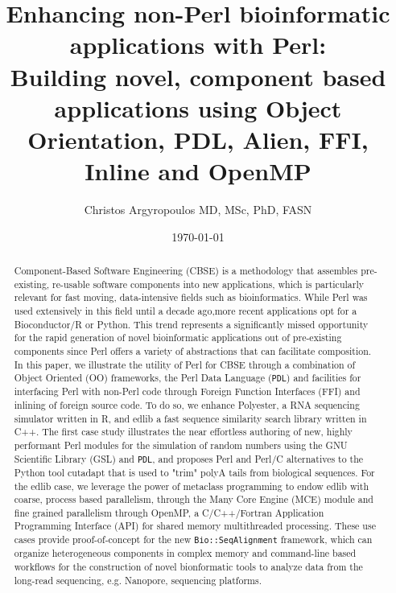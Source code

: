 \documentclass[10pt]{article}
\title{Enhancing non-Perl bioinformatic applications with Perl:\\[1ex] \large Building novel, component based applications using Object Orientation, PDL, Alien, FFI, Inline and OpenMP}
\author{Christos Argyropoulos MD, MSc, PhD, FASN}
\affil{Department of Internal Medicine, School of Medicine, University of New Mexico, Albuquerque, New Mexico, USA}
\date{\today}
\begin{document}
\maketitle

\begin{abstract}
Component-Based Software Engineering (CBSE) is a methodology that assembles pre-existing, re-usable software components into new applications, which is particularly relevant for fast moving, data-intensive fields such as bioinformatics. While Perl was used extensively in this field until a decade ago,more recent applications opt for a Bioconductor/R or Python. This trend represents a significantly missed opportunity for the rapid generation of novel bioinformatic applications out of pre-existing components since Perl offers a variety of abstractions that can facilitate composition.  In this paper, we illustrate the utility of Perl for CBSE  through a combination of Object Oriented (OO) frameworks, the Perl Data Language (\texttt{PDL}) and facilities for interfacing Perl with non-Perl code through Foreign Function Interfaces (FFI) and inlining of foreign source code. To do so, we enhance Polyester, a RNA sequencing simulator written in R, and edlib a fast sequence similarity search library written in C++. The first case study illustrates the near effortless authoring of new, highly performant Perl modules for the simulation of random numbers using the GNU Scientific Library (GSL) and \texttt{PDL}, and proposes Perl and Perl/C alternatives to the Python tool cutadapt that is used to "trim" polyA tails from biological sequences. For the edlib case, we leverage the power of metaclass programming to endow edlib with coarse, process based parallelism, through the Many Core Engine (MCE) module and fine grained parallelism through OpenMP, a C/C++/Fortran Application Programming Interface (API) for shared memory multithreaded processing. These use cases provide proof-of-concept for the new \texttt{Bio::SeqAlignment} framework, which can organize heterogeneous components in complex memory and command-line based workflows for the construction of novel bionformatic tools to analyze data from the long-read sequencing, e.g. Nanopore, sequencing platforms. 
\end{abstract}
\end{document}
